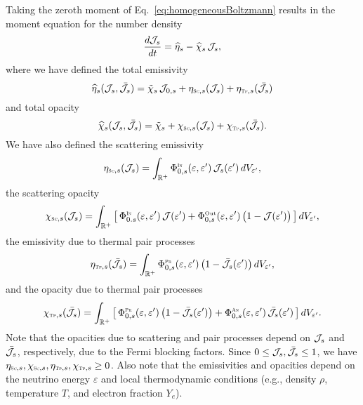 \documentclass[12pt]{article}
\newcommand{\IN}{\mbox{\tiny{\sc In}}}
\newcommand{\PROD}{\mbox{\tiny{\sc Pr}}}
\newcommand{\ANN}{\mbox{\tiny{\sc An}}}
\newcommand{\SC}{\mbox{\tiny{\sc Sc}}}      %
\newcommand{\TP}{\mbox{\tiny{\sc Tp}}}      %
\begin{document}
Taking the zeroth moment of Eq.~\eqref{eq:homogeneousBoltzmann} results in the moment equation for the number density
\begin{equation}
  \frac{d \mathcal{J}_{s}}{d t}
  =\widehat{\eta}_{s} - \widehat{\chi}_{s}\,\mathcal{J}_{s},
  \label{eq:momentNumber}
\end{equation}
where we have defined the total emissivity
\begin{equation}
  \widehat{\eta}_{s}(\cJ_{s},\bar{\cJ}_{s})
  =\tilde{\chi}_{s}\,\cJ_{0,s} + \eta_{\SC,s}(\cJ_{s}) + \eta_{\TP,s}(\bar{\cJ}_{s})
\end{equation}
and total opacity
\begin{equation}
  \widehat{\chi}_{s}(\cJ_{s},\bar{\cJ}_{s})
  =\tilde{\chi}_{s} + \chi_{\SC,s}(\cJ_{s}) + \chi_{\TP,s}(\bar{\cJ}_{s}).  
\end{equation}
We have also defined the scattering emissivity
\begin{equation}
  \eta_{\SC,s}(\cJ_{s})
  =\int_{\bbR^{+}}\Phi_{0,s}^{\IN}(\varepsilon,\varepsilon')\,\cJ_{s}(\varepsilon')\,dV_{\varepsilon'},
\end{equation}
the scattering opacity
\begin{equation}
  \chi_{\SC,s}(\cJ_{s})
  =\int_{\bbR^{+}}\big[\,\Phi_{0.s}^{\IN}(\varepsilon,\varepsilon')\,\cJ(\varepsilon')+\Phi_{0,s}^{\Out}(\varepsilon,\varepsilon')\,\big(1-\cJ(\varepsilon')\big)\,\big]\,dV_{\varepsilon'},
\end{equation}
the emissivity due to thermal pair processes
\begin{equation}
  \eta_{\TP,s}(\bar{\cJ}_{s})
  =\int_{\bbR^{+}}\Phi_{0,s}^{\PROD}(\varepsilon,\varepsilon')\,\big(1-\bar{\cJ}_{s}(\varepsilon')\big)\,dV_{\varepsilon'},
\end{equation}
and the opacity due to thermal pair processes
\begin{equation}
  \chi_{\TP,s}(\bar{\cJ}_{s})
  =\int_{\bbR^{+}}\big[\,\Phi_{0,s}^{\PROD}(\varepsilon,\varepsilon')\,\big(1-\bar{\cJ}_{s}(\varepsilon')\big)+\Phi_{0,s}^{\ANN}(\varepsilon,\varepsilon')\,\bar{\cJ}_{s}(\varepsilon')\,\big]\,dV_{\varepsilon'}.  
\end{equation}
Note that the opacities due to scattering and pair processes depend on $\mathcal{J}_{s}$ and $\bar{\mathcal{J}}_{s}$, respectively, due to the Fermi blocking factors.  
Since $0\le\mathcal{J}_{s},\bar{\mathcal{J}}_{s}\le1$, we have $\eta_{\SC,s},\chi_{\SC,s},\eta_{\TP,s},\chi_{\TP,s}\ge0$.  
Also note that the emissivities and opacities depend on the neutrino energy $\varepsilon$ and local thermodynamic conditions (e.g., density $\rho$, temperature $T$, and electron fraction $Y_{e}$).  
\end{document}
